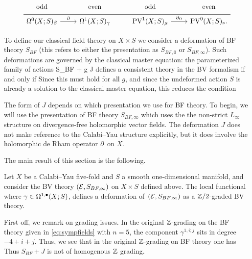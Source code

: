 \begin{equation}
  \label{eq:sympfields} 
  \begin{tikzcd}[row sep = 1 ex]
    {\rm odd} & {\rm even} & {\rm odd} & {\rm even} \\ \hline
    \Omega^{0}(X;S)_\beta \ar[r, "\del"] & \Omega^{1}(X;S)_\gamma & 
     \PV^{1}(X; S)_\mu \ar[r, "\div"] & \PV^{0}(X; S)_\nu.
\end{tikzcd}
\end{equation}

\parsec

To define our classical field theory on $X \times S$ we consider  a deformation of BF theory $S_{BF}$ (this refers to either the presentation as $S_{BF,0}$ or $S_{BF,\infty}$). 
Such deformations are governed by the classical master equation: the parameterized family of actions 
\beqn\label{eqn:defaction}
S_{BF} + g J
\eeqn
defines a consistent theory in the BV formalism if and only if
Since this must hold for all $g$, and since the undeformed action $S$ is already a solution to the classical master equation, this reduces the condition

The form of $J$ depends on which presentation we use for BF theory.
To begin, we will use the presentation of BF theory $S_{BF, \infty}$ which uses the the non-strict $L_\infty$ structure on divergence-free holomorphic vector fields.
The deformation $J$ does not make reference to the Calabi--Yau structure explicitly, but it does involve the holomorphic de Rham operator $\partial$ on $X$. 

The main result of this section is the following. 

\begin{thm}
\label{thm:dfn}
Let $X$ be a Calabi--Yau five-fold and $S$ a smooth one-dimensional manifold, and consider the BV theory $(\mathcal E, S_{BF,\infty})$ on $X \times S$ defined above. The local functional 
  where $\gamma \in \Omega^{1,\bullet}(X;S)$, defines a deformation of~$(\mathcal E,S_{BF,\infty})$ as a $\mathbb{Z}/2$-graded BV theory.
\end{thm}

\parsec[]

First off, we remark on grading issues. 
In the original $\mathbb{Z}$-grading on the BF theory given in \eqref{eq:sympfields} with $n=5$, the component $\gamma^{1,i;j}$ sits in degree $-4+i+j$. 
Thus, we see that in the original $\mathbb{Z}$-grading on BF theory one has
Thus $S_{BF} + J$ is not of homogenous $\mathbb Z$ grading.

